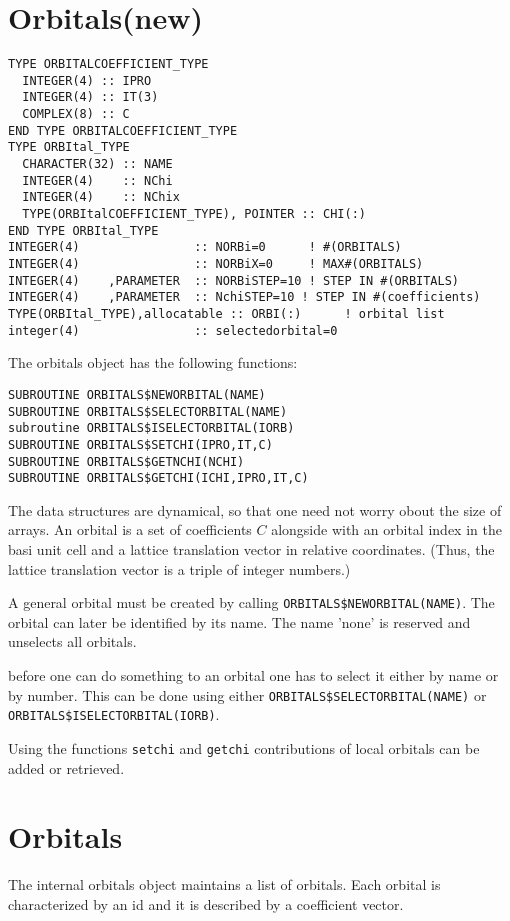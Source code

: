 \documentclass[11pt,a4paper]{report}
\begin{document}
\section{Orbitals(new)}
\begin{verbatim}
TYPE ORBITALCOEFFICIENT_TYPE
  INTEGER(4) :: IPRO
  INTEGER(4) :: IT(3)
  COMPLEX(8) :: C
END TYPE ORBITALCOEFFICIENT_TYPE
TYPE ORBItal_TYPE
  CHARACTER(32) :: NAME
  INTEGER(4)    :: NChi
  INTEGER(4)    :: NChix
  TYPE(ORBItalCOEFFICIENT_TYPE), POINTER :: CHI(:)
END TYPE ORBItal_TYPE
INTEGER(4)                :: NORBi=0      ! #(ORBITALS)
INTEGER(4)                :: NORBiX=0     ! MAX#(ORBITALS)
INTEGER(4)    ,PARAMETER  :: NORBiSTEP=10 ! STEP IN #(ORBITALS)
INTEGER(4)    ,PARAMETER  :: NchiSTEP=10 ! STEP IN #(coefficients)
TYPE(ORBItal_TYPE),allocatable :: ORBI(:)      ! orbital list
integer(4)                :: selectedorbital=0
\end{verbatim}


The orbitals object has the following functions:
\begin{verbatim}
SUBROUTINE ORBITALS$NEWORBITAL(NAME)
SUBROUTINE ORBITALS$SELECTORBITAL(NAME)
subroutine ORBITALS$ISELECTORBITAL(IORB)
SUBROUTINE ORBITALS$SETCHI(IPRO,IT,C)
SUBROUTINE ORBITALS$GETNCHI(NCHI)
SUBROUTINE ORBITALS$GETCHI(ICHI,IPRO,IT,C)
\end{verbatim}
The data structures are dynamical, so that one need not worry obout
the size of arrays. An orbital is a set of coefficients $C$ alongside
with an orbital index in the basi unit cell and a lattice translation
vector in relative coordinates. (Thus, the lattice translation vector
is a triple of integer numbers.)

A general orbital must be created by calling
\verb|ORBITALS$NEWORBITAL(NAME)|. The orbital can later be identified
by its name. The name 'none' is reserved and unselects all orbitals.

before one can do something to an orbital one has to select it either
by name or by number. This can be done using
either \verb|ORBITALS$SELECTORBITAL(NAME)| or
\verb|ORBITALS$ISELECTORBITAL(IORB)|.

Using the functions \verb|setchi| and \verb|getchi| contributions of
local orbitals can be added or retrieved.



\section{Orbitals}
The internal orbitals object maintains a list of orbitals. Each
orbital is characterized by an id and it is described by a coefficient
vector.
\end{document}
